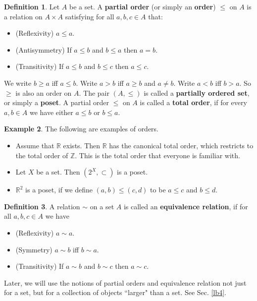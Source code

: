\documentclass[12pt,b5paper,notitlepage]{article}
\theoremstyle{definition}
\newtheorem{df}{Definition}[section]
\newtheorem{eg}[df]{Example}
\theoremstyle{plain}
\newcommand{\Zbb}{\mathbb Z}
\newcommand{\Rbb}{\mathbb R}
\numberwithin{equation}{section}
\begin{document}
\begin{df}
Let $A$ be a set. A \textbf{partial order} (or simply an \textbf{order}) $\leq$ on $A$ is a relation on $A\times A$ satisfying for all $a,b,c\in A$ that:
\begin{itemize}
\item (Reflexivity) $a\leq a$.
\item (Antisymmetry) If $a\leq b$ and $b\leq a$ then $a=b$.
\item (Transitivity) If $a\leq b$ and $b\leq c$ then $a\leq c$.
\end{itemize}
We write $b\geq a$ iff $a\leq b$. Write $a>b$ iff $a\geq b$ and $a\neq b$. Write $a<b$ iff $b>a$. So $\geq$ is also an order on $A$. The pair $(A,\leq)$ is called a \textbf{partially ordered set}, or simply a \textbf{poset}.  A partial order $\leq$ on $A$ is called a \textbf{total order}, if for every $a,b\in A$ we have either $a\leq b$ or $b\leq a$.
\end{df}


\begin{eg}
The following are examples of orders.
\begin{itemize}
\item Assume that $\Rbb$ exists. Then $\Rbb$ has the canonical total order, which restricts to the total order of $\Zbb$. This is the total order that everyone is familiar with.
\item Let $X$ be a set. Then $(2^X,\subset)$ is a poset.
\item $\Rbb^2$ is a poset, if we define $(a,b)\leq (c,d)$ to be $a\leq c$ and $b\leq d$. 
\end{itemize}
\end{eg}


\begin{df}\label{lb156}
A relation $\sim$ on a set $A$ is called an \textbf{equivalence relation},  if for all $a,b,c\in A$ we have
\begin{itemize}
\item (Reflexivity) $a\sim a$.
\item (Symmetry) $a\sim b$ iff $b\sim a$.
\item (Transitivity) If $a\sim b$ and $b\sim c$ then $a\sim c$.
\end{itemize}
\end{df}

Later, we will use the notions of partial orders and equivalence relation not just for a set, but for a collection of objects ``larger" than a set. See Sec. \ref{lb4}.
\end{document}
